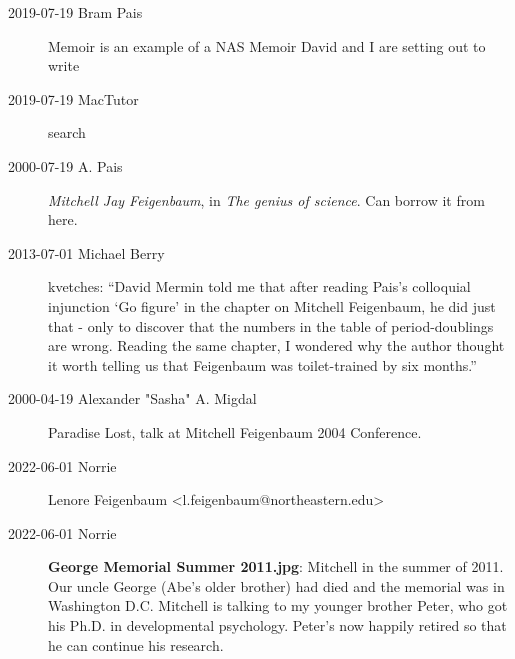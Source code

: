 \begin{description}
\item[2019-07-19 Bram Pais] 
{Memoir} is an example of a NAS Memoir David and I are setting out to
write

\item[2019-07-19 {MacTutor}]
{search}

\item[2000-07-19 A. Pais]
{\em Mitchell Jay Feigenbaum}, in {\em The genius of science}.
Can borrow it from
 {here}.

\item[2013-07-01 Michael Berry]
{kvetches}: ``David Mermin told me that after reading Pais's colloquial
injunction `Go figure' in the chapter on Mitchell Feigenbaum, he did just
that - only to discover that the numbers in the table of period-doublings
are wrong. Reading the same chapter, I wondered why the author thought it
worth telling us that Feigenbaum was toilet-trained by six months.''

\item[2000-04-19 Alexander "Sasha" A. Migdal]
 {Paradise Lost},
talk at Mitchell Feigenbaum 2004 Conference.

\item[2022-06-01 Norrie] Lenore Feigenbaum <l.feigenbaum@northeastern.edu>



\item[2022-06-01 Norrie]

\textbf{George Memorial Summer 2011.jpg}:
Mitchell in the summer of 2011.  Our uncle George (Abe's older brother) had
died and the memorial was in Washington D.C. Mitchell is talking to my
younger brother Peter, who got his Ph.D. in developmental psychology.
Peter's now happily retired so that he can continue his research.


\end{description}



\printbibliography[heading=subbibintoc,title={References}]

